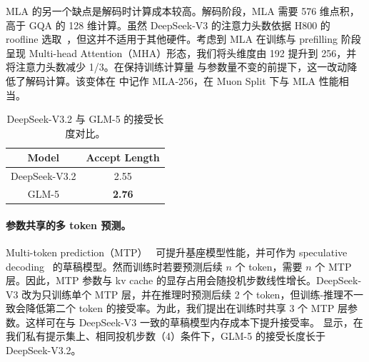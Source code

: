 MLA 的另一个缺点是解码时计算成本较高。解码阶段，MLA 需要 576 维点积，高于 GQA 的 128 维计算。虽然 DeepSeek-V3 的注意力头数依据 H800 的 roofline 选取~\cite{zhao2025insights}，但这并不适用于其他硬件。考虑到 MLA 在训练与 prefilling 阶段呈现 Multi-head Attention（MHA）形态，我们将头维度由 192 提升到 256，并将注意力头数减少 1/3。在保持训练计算量
与参数量不变的前提下，这一改动降低了解码计算。该变体在  中记作 MLA-256，在 Muon Split 下与 MLA 性能相当。

\begin{table}
    \centering
    \caption{DeepSeek-V3.2 与 GLM-5 的接受长度对比。}
    \label{tab:mtp}
    \begin{tabular}{c|c}
        \toprule
        Model  & Accept Length \\
        \midrule
        DeepSeek-V3.2 & 2.55 \\
        GLM-5  & \textbf{2.76}\\
        \bottomrule
    \end{tabular}
\end{table}

\paragraph{参数共享的多 token 预测。} Multi-token prediction（MTP）~\cite{gloeckle2024mtp,liu2024deepseek} 可提升基座模型性能，并可作为 speculative decoding~\cite{leviathan2023spec} 的草稿模型。然而训练时若要预测后续 $n$ 个 token，需要 $n$ 个 MTP 层。因此，MTP 参数与 kv cache 的显存占用会随投机步数线性增长。DeepSeek-V3 改为只训练单个 MTP 层，并在推理时预测后续 2 个 token，但训练-推理不一致会降低第二个 token 的接受率。为此，我们提出在训练时共享 3 个 MTP 层参数。这样可在与 DeepSeek-V3 一致的草稿模型内存成本下提升接受率。 显示，在我们私有提示集上、相同投机步数（4）条件下，GLM-5 的接受长度长于 DeepSeek-V3.2。

